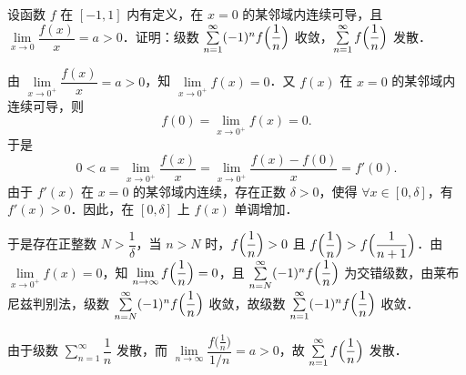 设函数 $f$ 在 $[-1,1]$ 内有定义，在 $x=0$ 的某邻域内连续可导，且 $\lim\limits_{x\to0}\dfrac{f(x)}{x}=a>0$．证明：级数 $\sum\limits_{n=1}^{\infty}(-1)^nf\Bigl(\dfrac{1}{n}\Bigr)$ 收敛，$\sum\limits_{n=1}^{\infty}f\Bigl(\dfrac{1}{n}\Bigr)$ 发散．
\begin{solution}
由 $\lim\limits_{x\to0^+}\dfrac{f(x)}{x}=a>0$，知 $\lim\limits_{x\to0^+}f(x)=0$．又 $f(x)$ 在 $x=0$ 的某邻域内连续可导，则
\[
  f(0)=\lim_{x\to0^+}f(x)=0.
\]
于是
\[
  0<a=\lim_{x\to0^+}\frac{f(x)}{x}=\lim_{x\to0^+}\frac{f(x)-f(0)}{x}=f'(0).
\]
由于 $f'(x)$ 在 $x=0$ 的某邻域内连续，存在正数 $\delta>0$，使得 $\forall x\in[0,\delta]$，有 $f'(x)>0$．因此，在 $[0,\delta]$ 上 $f(x)$ 单调增加．

于是存在正整数 $N>\dfrac{1}{\delta}$，当 $n>N$ 时，$f\Bigl(\dfrac{1}{n}\Bigr)>0$ 且 $f\Bigl(\dfrac{1}{n}\Bigr)>f\Bigl(\dfrac{1}{n+1}\Bigr)$．由 $\lim\limits_{x\to0^+}f(x)=0$，知 $\lim\limits_{n\to\infty}f\Bigl(\dfrac{1}{n}\Bigr)=0$，且 $\sum\limits_{n=N}^{\infty}(-1)^nf\Bigl(\dfrac{1}{n}\Bigr)$ 为交错级数，由莱布尼兹判别法，级数 $\sum\limits_{n=N}^{\infty}(-1)^nf\Bigl(\dfrac{1}{n}\Bigr)$ 收敛，故级数 $\sum\limits_{n=1}^{\infty}(-1)^nf\Bigl(\dfrac{1}{n}\Bigr)$ 收敛．

由于级数 $\sum\limits_{n=1}^{\infty}\dfrac{1}{n}$ 发散，而 $\lim\limits_{n\to\infty}\dfrac{f\bigl(\frac{1}{n}\bigr)}{1/n}=a>0$，故 $\sum\limits_{n=1}^{\infty}f\Bigl(\dfrac{1}{n}\Bigr)$ 发散．
\end{solution}

